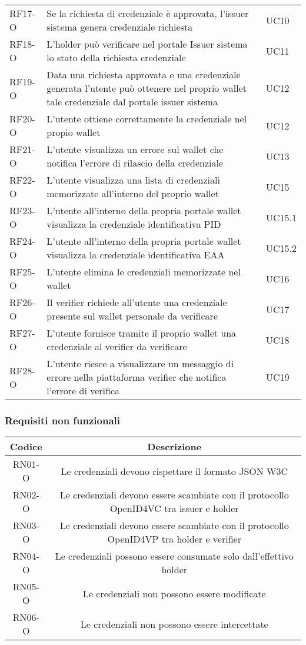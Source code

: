 \begin{longtable}{|p{}|p{}|p{}|}
        RF17-O & Se la richiesta di credenziale  è approvata, l'issuer sistema genera credenziale richiesta & UC10\\
        RF18-O & L'holder può verificare nel portale Issuer sistema lo stato della richiesta credenziale & UC11\\ 
        RF19-O & Data una richiesta approvata e una credenziale generata l'utente può ottenere nel proprio wallet tale credenziale dal portale issuer sistema & UC12 \\
        RF20-O & L'utente ottiene correttamente la credenziale nel propio wallet & UC12\\
        RF21-O & L'utente visualizza un errore sul wallet che notifica l'errore di rilascio della credenziale & UC13\\
        RF22-O & L'utente visualizza una lista di credenziali memorizzate all'interno del proprio wallet& UC15\\
        RF23-O & L'utente all'interno della propria portale wallet visualizza la credenziale identificativa PID & UC15.1\\
        RF24-O & L'utente all'interno della propria portale wallet visualizza la credenziale identificativa EAA & UC15.2\\
        RF25-O & L'utente elimina le credenziali memorizzate nel wallet & UC16\\
        RF26-O & Il verifier richiede all'utente una credenziale presente sul wallet personale da verificare & UC17\\
        RF27-O & L'utente fornisce tramite il proprio wallet una credenziale al verifier da verificare & UC18\\
        RF28-O & L'utente riesce a visualizzare un messaggio di errore nella piattaforma verifier che notifica l'errore di verifica & UC19\\
        \hline
    \end{longtable}

\subsubsection*{Requisiti non funzionali}
    \begin{longtable}{|c|c|}
        \hline
        \textbf{Codice} & \textbf{Descrizione} \\
        \hline
        RN01-O & Le credenziali devono rispettare il formato JSON W3C\\
        RN02-O & Le credenziali devono essere scambiate con il protocollo OpenID4VC tra issuer e holder\\
        RN03-O & Le credenziali devono essere scambiate con il protocollo OpenID4VP tra holder e verifier\\
        RN04-O & Le credenziali possono essere consumate solo dall'effettivo holder\\
        RN05-O & Le credenziali non possono essere modificate\\
        RN06-O & Le credenziali non possono essere intercettate\\
        \hline
    \end{longtable}